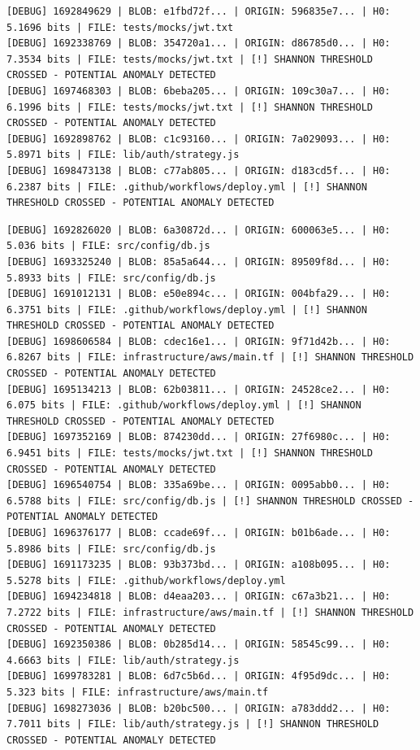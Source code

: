 \documentclass[12pt, a4paper, oneside]{report}
\begin{document}
\begin{lstlisting}[basicstyle=\tiny\ttfamily]
[DEBUG] 1692849629 | BLOB: e1fbd72f... | ORIGIN: 596835e7... | H0: 5.1696 bits | FILE: tests/mocks/jwt.txt
[DEBUG] 1692338769 | BLOB: 354720a1... | ORIGIN: d86785d0... | H0: 7.3534 bits | FILE: tests/mocks/jwt.txt | [!] SHANNON THRESHOLD CROSSED - POTENTIAL ANOMALY DETECTED
[DEBUG] 1697468303 | BLOB: 6beba205... | ORIGIN: 109c30a7... | H0: 6.1996 bits | FILE: tests/mocks/jwt.txt | [!] SHANNON THRESHOLD CROSSED - POTENTIAL ANOMALY DETECTED
[DEBUG] 1692898762 | BLOB: c1c93160... | ORIGIN: 7a029093... | H0: 5.8971 bits | FILE: lib/auth/strategy.js
[DEBUG] 1698473138 | BLOB: c77ab805... | ORIGIN: d183cd5f... | H0: 6.2387 bits | FILE: .github/workflows/deploy.yml | [!] SHANNON THRESHOLD CROSSED - POTENTIAL ANOMALY DETECTED
\end{lstlisting}
\begin{lstlisting}[basicstyle=\tiny\ttfamily]
[DEBUG] 1692826020 | BLOB: 6a30872d... | ORIGIN: 600063e5... | H0: 5.036 bits | FILE: src/config/db.js
[DEBUG] 1693325240 | BLOB: 85a5a644... | ORIGIN: 89509f8d... | H0: 5.8933 bits | FILE: src/config/db.js
[DEBUG] 1691012131 | BLOB: e50e894c... | ORIGIN: 004bfa29... | H0: 6.3751 bits | FILE: .github/workflows/deploy.yml | [!] SHANNON THRESHOLD CROSSED - POTENTIAL ANOMALY DETECTED
[DEBUG] 1698606584 | BLOB: cdec16e1... | ORIGIN: 9f71d42b... | H0: 6.8267 bits | FILE: infrastructure/aws/main.tf | [!] SHANNON THRESHOLD CROSSED - POTENTIAL ANOMALY DETECTED
[DEBUG] 1695134213 | BLOB: 62b03811... | ORIGIN: 24528ce2... | H0: 6.075 bits | FILE: .github/workflows/deploy.yml | [!] SHANNON THRESHOLD CROSSED - POTENTIAL ANOMALY DETECTED
[DEBUG] 1697352169 | BLOB: 874230dd... | ORIGIN: 27f6980c... | H0: 6.9451 bits | FILE: tests/mocks/jwt.txt | [!] SHANNON THRESHOLD CROSSED - POTENTIAL ANOMALY DETECTED
[DEBUG] 1696540754 | BLOB: 335a69be... | ORIGIN: 0095abb0... | H0: 6.5788 bits | FILE: src/config/db.js | [!] SHANNON THRESHOLD CROSSED - POTENTIAL ANOMALY DETECTED
[DEBUG] 1696376177 | BLOB: ccade69f... | ORIGIN: b01b6ade... | H0: 5.8986 bits | FILE: src/config/db.js
[DEBUG] 1691173235 | BLOB: 93b373bd... | ORIGIN: a108b095... | H0: 5.5278 bits | FILE: .github/workflows/deploy.yml
[DEBUG] 1694234818 | BLOB: d4eaa203... | ORIGIN: c67a3b21... | H0: 7.2722 bits | FILE: infrastructure/aws/main.tf | [!] SHANNON THRESHOLD CROSSED - POTENTIAL ANOMALY DETECTED
[DEBUG] 1692350386 | BLOB: 0b285d14... | ORIGIN: 58545c99... | H0: 4.6663 bits | FILE: lib/auth/strategy.js
[DEBUG] 1699783281 | BLOB: 6d7c5b6d... | ORIGIN: 4f95d9dc... | H0: 5.323 bits | FILE: infrastructure/aws/main.tf
[DEBUG] 1698273036 | BLOB: b20bc500... | ORIGIN: a783ddd2... | H0: 7.7011 bits | FILE: lib/auth/strategy.js | [!] SHANNON THRESHOLD CROSSED - POTENTIAL ANOMALY DETECTED

\end{lstlisting}
\end{document}
